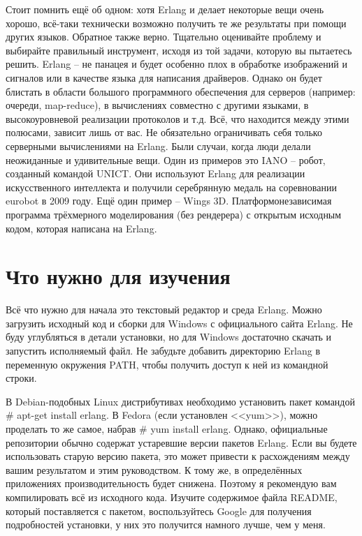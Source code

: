 \documentclass[a4paper,12pt]{report}
\newcommand{\ops}{\colorbox{lgreen}}
\begin{document}
Стоит помнить ещё об одном: хотя Erlang и делает некоторые вещи очень хорошо, всё\--таки технически возможно получить те же результаты при помощи других языков. Обратное также верно. Тщательно оценивайте проблему и выбирайте правильный инструмент, исходя из той задачи, которую вы пытаетесь решить. Erlang \--- не панацея и будет особенно плох в обработке изображений и сигналов или в качестве языка для написания драйверов. Однако он будет блистать в области большого программного обеспечения для серверов (например: очереди, map\--reduce), в вычислениях совместно с другими языками, в высокоуровневой реализации протоколов и т.д. Всё, что находится между этими полюсами, зависит лишь от вас. Не обязательно ограничивать себя только серверными вычислениями на Erlang. Были случаи, когда люди делали неожиданные и удивительные вещи. Один из примеров это IANO \--- робот, созданный командой UNICT. Они используют Erlang для реализации искусственного интеллекта и получили серебрянную медаль на соревновании eurobot в 2009 году. Ещё один пример \--- Wings 3D. Платформонезависимая программа трёхмерного моделирования (без рендерера) с открытым исходным кодом, которая написана на Erlang.

\section{Что нужно для изучения}
Всё что нужно для начала это текстовый редактор и среда Erlang. Можно загрузить исходный код и сборки для Windows с официального сайта Erlang. Не буду углубляться в детали установки, но для Windows достаточно скачать и запустить исполняемый файл. Не забудьте добавить директорию Erlang в переменную окружения PATH, чтобы получить доступ к ней из командной строки.

В Debian\--подобных Linux дистрибутивах необходимо установить пакет командой \ops{\# apt-get install erlang}. В Fedora (если установлен <<yum>>), можно проделать то же самое, набрав \ops{\# yum install erlang}. Однако, официальные репозитории обычно содержат устаревшие версии пакетов Erlang. Если вы будете использовать старую версию пакета, это может привести к расхождениям между вашим результатом и этим руководством. К тому же, в определённых приложениях производительность будет снижена. Поэтому я рекомендую вам компилировать всё из исходного кода. Изучите содержимое файла README, который поставляется с пакетом, воспользуйтесь Google для получения подробностей установки, у них это получится намного лучше, чем у меня.
\end{document}
